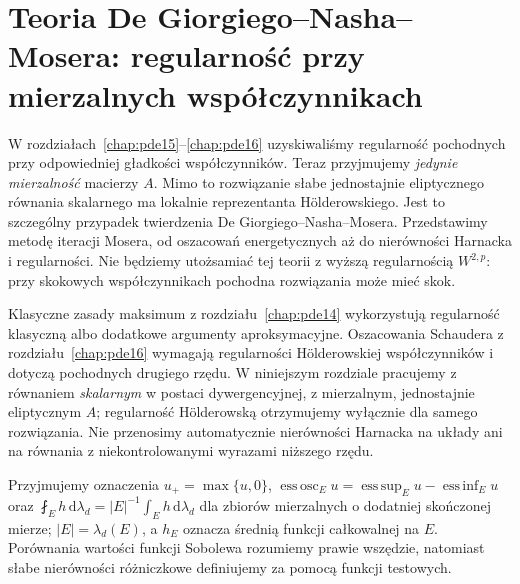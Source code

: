\chapter[Regularność De Giorgiego--Nasha--Mosera]{Teoria De Giorgiego--Nasha--Mosera: regularność przy mierzalnych współczynnikach}
\label{chap:pde17}

W rozdziałach~\ref{chap:pde15}--\ref{chap:pde16} uzyskiwaliśmy regularność
pochodnych przy odpowiedniej gładkości współczynników. Teraz przyjmujemy
\emph{jedynie mierzalność} macierzy $A$. Mimo to rozwiązanie słabe
jednostajnie eliptycznego równania skalarnego ma lokalnie reprezentanta
Hölderowskiego. Jest to szczególny przypadek twierdzenia
De Giorgiego--Nasha--Mosera. Przedstawimy metodę iteracji Mosera,
od oszacowań energetycznych aż do nierówności Harnacka i regularności.
Nie będziemy utożsamiać tej teorii z wyższą regularnością $W^{2,p}$:
przy skokowych współczynnikach pochodna rozwiązania może mieć skok.

\begin{uwaga}
\label{rem:pde-v43-regularity-map}
Klasyczne zasady maksimum z rozdziału~\ref{chap:pde14}
wykorzystują regularność klasyczną albo dodatkowe argumenty
aproksymacyjne. Oszacowania Schaudera z
rozdziału~\ref{chap:pde16} wymagają regularności H\"olderowskiej
współczynników i dotyczą pochodnych drugiego rzędu.
W niniejszym rozdziale pracujemy z równaniem \emph{skalarnym}
w postaci dywergencyjnej, z mierzalnym, jednostajnie
eliptycznym $A$; regularność H\"olderowską otrzymujemy
wyłącznie dla samego rozwiązania. Nie przenosimy automatycznie
nierówności Harnacka na układy ani na równania z niekontrolowanymi
wyrazami niższego rzędu.
\end{uwaga}

Przyjmujemy oznaczenia $u_+=\max\{u,0\}$,
$\operatorname*{ess\,osc}_E u=
\operatorname*{ess\,sup}_E u-\operatorname*{ess\,inf}_E u$ oraz
$\fint_E h\,\mathrm d\lambda_d=|E|^{-1}
\int_E h\,\mathrm d\lambda_d$ dla zbiorów mierzalnych o dodatniej skończonej mierze;
$|E|=\lambda_d(E)$, a $h_E$ oznacza średnią funkcji
całkowalnej na $E$. Porównania wartości funkcji Sobolewa rozumiemy prawie
wszędzie, natomiast słabe nierówności różniczkowe
definiujemy za pomocą funkcji testowych.

